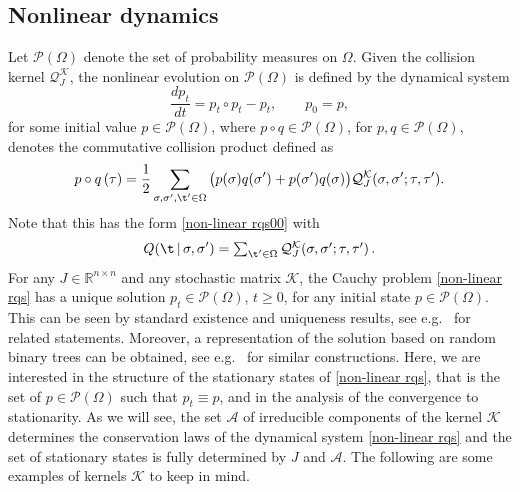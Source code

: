 \documentclass[11pt,reqno]{amsart}
\numberwithin{equation}{section}
\numberwithin{figure}{section}
\newcommand{\1}{\mathds{1}}
\newcommand{\tc}{\,|\,}
\let\si=\sigma
\let\O=\Omega
\newcommand{\cA}{\ensuremath{\mathcal A}}
\newcommand{\cK}{\ensuremath{\mathcal K}}
\newcommand{\cP}{\ensuremath{\mathcal P}}
\newcommand{\cQ}{\ensuremath{\mathcal Q}}
\newcommand{\bbR}{{\ensuremath{\mathbb R}} }
\begin{document}
\subsection{Nonlinear dynamics}
Let $\cP(\Omega)$ denote the set of probability measures on $\Omega$.
Given the collision kernel $\cQ_J^\cK$, the nonlinear evolution on $\cP(\Omega)$
is defined by the dynamical system
\begin{equation}
\label{non-linear rqs}
    \frac{dp_t}{dt} = p_t \circ p_t - p_t, \qquad p_0 = p,
\end{equation}
for some initial value \(p \in \mathcal{P}(\Omega)\), where \(p \circ q \in \mathcal{P}(\Omega)\), for \(p, q \in \mathcal{P}(\Omega)\), denotes the commutative collision product defined as
\begin{equation}\label{collision operator}
p \circ q \,(\tau) = \frac{1}{2}\sum_{\sigma, \sigma',\t'\in \O}\big(p(\sigma) q(\sigma')+p(\sigma')q(\sigma)\big)\mathcal{Q}_J^{\cK}(\sigma, \sigma'; \tau, \tau').
\end{equation}
Note that this has the form \eqref{non-linear rqs00} with 
\[
Q(\t\tc\si,\si') = \textstyle{\sum_{\t'\in\O}}\,\mathcal{Q}_J^{\cK}(\sigma, \sigma'; \tau, \tau')\,.
\]
For any $J\in\bbR^{n\times n}$ and any stochastic matrix $\cK$, the Cauchy problem \eqref{non-linear rqs}
has a unique solution $p_t\in \cP(\O)$, $t\ge 0$, for any initial state $p \in \mathcal{P}(\Omega)$. This can be seen by standard existence and uniqueness results, see e.g.\ \cite{BBS} for related statements. Moreover, a  representation of the solution based on random binary  trees can be obtained, see e.g.\ \cite{CCG00,CP2024nonlinear,caputo2025cutoff} for similar constructions. 
Here, we are interested in the structure of the stationary states of \eqref{non-linear rqs}, that is the set of $p \in \mathcal{P}(\Omega)$ such that $p_t\equiv p$, and in the analysis of the convergence to stationarity.  
As we will see, the set $\cA$ of irreducible components of the kernel $\cK$ determines the conservation laws of the dynamical system \eqref{non-linear rqs} and the set of stationary states is fully determined by $J$ and $\cA$. The following are some examples of kernels $\cK$ to keep in mind.
\end{document}
